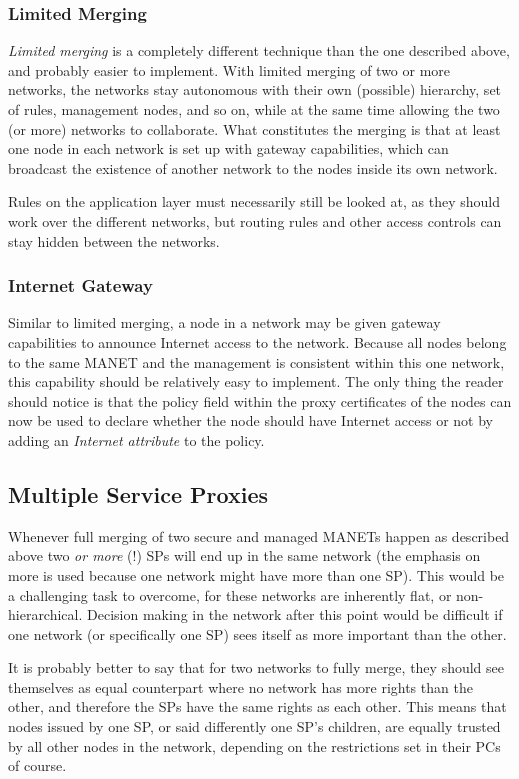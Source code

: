 \subsubsection*{Limited Merging}
\emph{Limited merging} is a completely different technique than the one
described above, and probably easier to implement. With limited merging of two
or more networks, the networks stay autonomous with their own (possible)
hierarchy, set of rules, management nodes, and so on, while at the same time
allowing the two (or more) networks to collaborate. What constitutes the merging
is that at least one node in each network is set up with gateway capabilities,
which can broadcast the existence of another network to the nodes inside its
own network.

Rules on the application layer must necessarily still be looked at, as they
should work over the different networks, but routing rules and other access
controls can stay hidden between the networks.

\subsubsection*{Internet Gateway}
Similar to limited merging, a node in a network may be given gateway capabilities
to announce Internet access to the network. Because all nodes belong to the same
\ac{MANET} and the management is consistent within this one network, this
capability should be relatively easy to implement. The only thing the reader
should notice is that the policy field within the proxy certificates of the
nodes can now be used to declare whether the node should have Internet access or
not by adding an \emph{Internet attribute} to the policy.

\subsection{Multiple Service Proxies}
Whenever full merging of two secure and managed MANETs happen as described above
two \emph{or more} (!) SPs will end up in the same network (the emphasis on more
is used because one network might have more than one SP). This would be a
challenging task to overcome, for these networks are inherently flat, or
non-hierarchical. Decision making in the network after this point would be
difficult if one network (or specifically one SP) sees itself as more important
than the other.

It is probably better to say that for two networks to fully merge, they should
see themselves as equal counterpart where no network has more rights than the
other, and therefore the \acp{SP} have the same rights as each other. This means
that nodes issued by one \ac{SP}, or said differently one SP's children, are
equally trusted by all other nodes in the network, depending on the restrictions
set in their \acp{PC} of course.

